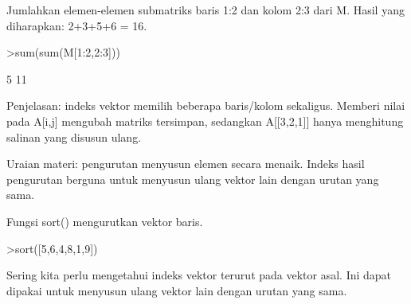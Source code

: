 \documentclass[a4paper,10pt]{article}
\begin{document}
\begin{eulernotebook}
\begin{eulercomment}
\begin{eulercomment}
\begin{eulercomment}
\begin{eulercomment}
\begin{eulercomment}
\begin{eulercomment}
\begin{eulercomment}
\begin{eulercomment}
\begin{eulercomment}
\begin{eulercomment}
\begin{eulercomment}
\begin{eulercomment}
\begin{eulercomment}
\begin{eulercomment}
\begin{eulercomment}
\begin{eulercomment}
\begin{eulercomment}
\begin{eulercomment}
\begin{eulercomment}
Jumlahkan elemen-elemen submatriks baris 1:2 dan kolom 2:3 dari M.
Hasil yang diharapkan: 2+3+5+6 = 16.
\end{eulercomment}
\begin{eulerprompt}
>sum(sum(M[1:2,2:3]))
\end{eulerprompt}
\begin{euleroutput}
              5 
             11 
\end{euleroutput}
\begin{eulercomment}
Penjelasan: indeks vektor memilih beberapa baris/kolom sekaligus. Memberi
nilai pada A[i,j] mengubah matriks tersimpan, sedangkan A[[3,2,1]] hanya
menghitung salinan yang disusun ulang.

\begin{eulercomment}
\begin{eulercomment}
Uraian materi: pengurutan menyusun elemen secara menaik. Indeks hasil
pengurutan berguna untuk menyusun ulang vektor lain dengan urutan yang sama.

Fungsi sort() mengurutkan vektor baris.
\end{eulercomment}
\begin{eulerprompt}
>sort([5,6,4,8,1,9])
\end{eulerprompt}
\begin{euleroutput}
  [1,  4,  5,  6,  8,  9]
\end{euleroutput}
\begin{eulercomment}
Sering kita perlu mengetahui indeks vektor terurut pada vektor asal. Ini
dapat dipakai untuk menyusun ulang vektor lain dengan urutan yang sama.


\end{eulercomment}
\end{eulercomment}
\end{eulercomment}
\end{eulercomment}
\end{eulercomment}
\end{eulercomment}
\end{eulercomment}
\end{eulercomment}
\end{eulercomment}
\end{eulercomment}
\end{eulercomment}
\end{eulercomment}
\end{eulercomment}
\end{eulercomment}
\end{eulercomment}
\end{eulercomment}
\end{eulercomment}
\end{eulercomment}
\end{eulercomment}
\end{eulercomment}
\end{eulercomment}
\end{eulernotebook}
\end{document}
